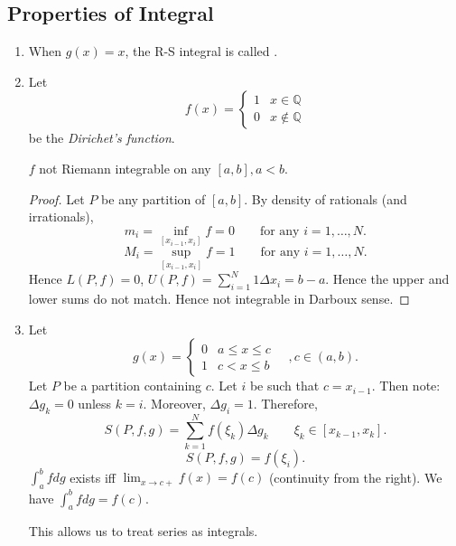 
\subsection{Properties of Integral}

\begin{example}
	\begin{enumerate}
		\item When $g(x) = x$, the R-S integral is called .
		\item Let
			\[
				f(x) = \begin{cases}
					1 & x \in \mathbb{Q}\\
					0 & x \not\in \mathbb{Q}
				\end{cases}
			\]
			be the \textit{Dirichet's function}. 
			\begin{claim}
				$f$ not Riemann integrable on any $[a,b], a < b$. 
			\end{claim}
				\begin{proof}
					Let $P$ be any partition of $[a,b]$. By density of rationals (and irrationals),
					\[
						m_i = \operatorname{inf} _{[x_{i-1}, x_i]}f = 0 \qquad \text{for any }i = 1,\ldots, N
					.\] 
\[
						M_i = \operatorname{sup} _{[x_{i-1}, x_i]}f = 1 \qquad \text{for any }i = 1,\ldots, N
					.\]
					Hence $L(P, f) = 0$, $U(P, f) = \sum_{i=1}^{N} 1 \Delta x_i = b-a$. Hence the upper and lower sums do not match. Hence not integrable in Darboux sense.
				\end{proof}
			\item Let 
				\[
					g(x) = 
					\begin{cases}
						0 & a\le x\le c \\
						1 & c< x\le b
					\end{cases}
				\quad, c \in (a,b)
			.\] 
			Let $P$ be a partition containing $c$. Let $i$ be such that $c = x_{i-1}$. Then note: $\Delta g_k = 0$ unless $k = i$. Moreover, $\Delta g_i = 1$. Therefore, 
			\[
				S(P, f, g) = \sum_{k=1}^{N} f(\xi_k) \Delta g_k \qquad \xi_k \in [x_{k-1}, x_k]
			.\] 
			\[
				S(P, f, g) = f(\xi_i)
			.\] 
			$\int_a^b f dg$ exists iff $\lim_{x \to c+} f(x) = f(c)$ (continuity from the right). We have $\int_a^b f dg = f(c)$.
			\begin{remark}
				This allows us to treat series as integrals.
			\end{remark}
	\end{enumerate}
\end{example}

